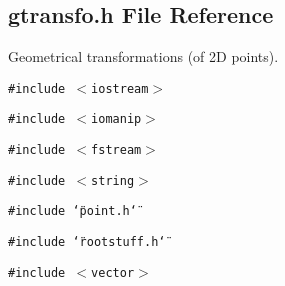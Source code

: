\subsection{gtransfo.h File Reference}
\label{gtransfo_h}
Geometrical transformations (of 2D points). 


{\tt \#include $<$iostream$>$}\par
{\tt \#include $<$iomanip$>$}\par
{\tt \#include $<$fstream$>$}\par
{\tt \#include $<$string$>$}\par
{\tt \#include \char`\"{}point.h\char`\"{}}\par
{\tt \#include \char`\"{}rootstuff.h\char`\"{}}\par
{\tt \#include $<$vector$>$}\par
